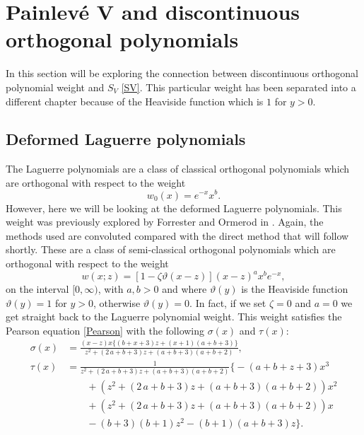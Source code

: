 \documentclass[12pt]{article}
\def\P{Painlev\'e }
\numberwithin{figure}{section}
\numberwithin{equation}{section}
\numberwithin{table}{section}
\begin{document}
\newpage\section{\P V and discontinuous orthogonal polynomials}
In this section will be exploring the connection between discontinuous orthogonal polynomial weight and $S_{V}$ \eqref{SV}.
This particular weight has been separated into a different chapter because of the Heaviside function which is $1$ for $y>0$. \subsection{Deformed Laguerre polynomials}
The Laguerre polynomials are a class of classical orthogonal polynomials which are orthogonal with respect to the weight
$$w_0(x)=e^{-x}x^b.$$
However, here we will be looking at the deformed Laguerre polynomials. This weight was previously explored by Forrester and Ormerod in \cite{Ormerod}. Again, the methods used are convoluted compared with the direct method that will follow shortly. These are a class of semi-classical orthogonal polynomials which are
orthogonal with respect to the weight
\begin{equation}
w(x;z)=[1-\zeta\vartheta(x-z)](x-z)^ a x^ b e^{-x},\label{weight3}
\end{equation}
on the interval $[0,\infty)$, with $ a, b>0$ and where $\vartheta(y)$ is the Heaviside function $\vartheta(y)=1$ for $y>0$, otherwise
$\vartheta(y)=0$.
In fact, if we set $\zeta=0$ and $a=0$ we get straight back to the Laguerre polynomial weight.  This weight satisfies the Pearson equation \eqref{Pearson} with the following $\sigma(x)$ and $\tau(x)$:
\begin{align*}
\sigma(x)&={\frac { \left( x-z \right)x  \big\{  \left( b+x+3 \right) z+ \left( x
+1 \right)  \left( a+b+3 \right)\big\} }{{z}^{2}+ \left( 2\,a+b+3
 \right) z+ \left( a+b+3 \right)  \left( a+b+2 \right) }},\\
\tau(x)&=\frac{1}{{{z}^{2}+
 \left( 2\,a+b+3 \right) z+ \left( a+b+3 \right)  \left( a+b+2
 \right) }}\bigg\{ -\left( a+b+z+3 \right) {x}^{3}\\
 &\qquad+ \left( {z}^{2}+ \left( 2\,a+
b+3 \right) z+ \left( a+b+3 \right)  \left( a+b+2 \right)  \right) {x}
^{2}\\
&\qquad+ \left( {z}^{2}+ \left( 2\,a+b+3 \right) z+ \left( a+b+3 \right)
 \left( a+b+2 \right)  \right) x\\
 &\qquad- \left( b+3 \right)  \left( b+1
 \right) {z}^{2}- \left( b+1 \right)  \left( a+b+3 \right) z\bigg\}.
\end{align*}
\end{document}
